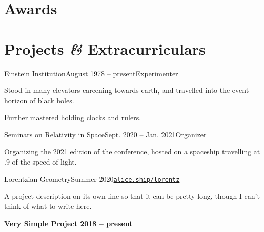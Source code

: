 \documentclass{resume}
\begin{document}
\noindent
\renewcommand{\refname}{Publications}   %

\nocite{*}
\sectionlineskip

\section{Awards} 
\begin{content}
    
\sectionlineskip
\end{content}

\section{Projects \textbf{\em\&} Extracurriculars} 
\begin{content}
    
    \begin{position}{Einstein Institution}{August 1978 -- present}{Experimenter}{}{}
        \item Stood in many elevators careening towards earth, and travelled into the event horizon of black holes. 
        \item Further mastered holding clocks and rulers.
    \end{position}
    
    \begin{position}{Seminars on Relativity in Space}{Sept. 2020 -- Jan. 2021}{Organizer}{}{}
    \item Organizing the 2021 edition of the conference, hosted on a spaceship travelling at .9 of the speed of light.
    \end{position}
    
    \begin{position}{Lorentzian Geometry}{Summer 2020}{\normalfont\href{https://alice.ship/lorentz}{\texttt{alice.ship/lorentz}}}{}{}
    \item A project description on its own line so that it can be pretty long, though I can't think of what to write here.  
    \end{position}
    
    {\bf Very Simple Project} 
    \hfill {\bf 2018 -- present}

\sectionlineskip    
\end{content}
\end{document}
